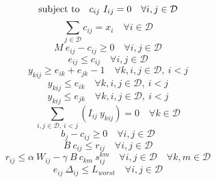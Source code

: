 \documentclass[preprint]{elsarticle}
\begin{document}
\begin{equation}
\textup{subject  to} \ \ \ c_{ij} \ I_{ij} = 0 \quad \forall i,j \in \mathcal{D}
\label{zeroRPOlp:backupDifferentSRG}
\end{equation}
\begin{equation}
\sum_{j \in \mathcal{D}} c_{ij} = x_i \quad \forall i \in \mathcal{D}
\label{zeroRPOlp:totalBackupsSite}
\end{equation}
\begin{equation}
M \ e_{ij} - c_{ij} \geq 0 \quad \forall i,j \in \mathcal{D}
\label{zeroRPOlp:evaluateEijA}
\end{equation}
\begin{equation}
e_{ij} \leq c_{ij} \quad \forall i,j \in \mathcal{D}
\label{zeroRPOlp:evaluateEijB}
\end{equation}
\begin{equation}
y_{kij} \geq e_{ik} + e_{jk} - 1 \quad \forall k,i,j \in \mathcal{D}, \ i < j
\label{zeroRPOlp:evaluateEijC}
\end{equation}
\begin{equation}
y_{kij} \leq e_{ik} \quad \forall k,i,j \in \mathcal{D}, \ i < j
\label{zeroRPOlp:evaluateEijD}
\end{equation}
\begin{equation}
y_{kij} \leq e_{jk} \quad \forall k,i,j \in \mathcal{D}, \ i < j
\label{zeroRPOlp:evaluateEijE}
\end{equation}
\begin{equation}
\sum_{i,j \in \mathcal{D}, \ i < j} (I_{ij} \ y_{kij}) = 0 \quad \forall k \in \mathcal{D}
\label{zeroRPOlp:savePhysicalServers}
\end{equation}
\begin{equation}
b_j - c_{ij} \geq 0 \quad \forall i,j \in \mathcal{D}
\label{zeroRPOlp:maxDedicatedServers}
\end{equation}
\begin{equation}
B \ c_{ij} \leq r_{ij} \quad \forall i,j \in \mathcal{D}
\label{zeroRPOlp:bandwidthDemand}
\end{equation}
\begin{equation}
r_{ij} \leq \alpha \ W_{ij} - \gamma \ B \ c_{km} \ s^{km}_{ij} \quad \forall i,j \in \mathcal{D} \quad \forall k,m \in \mathcal{D}
\label{zeroRPOlp:backupPath}
\end{equation}
\begin{equation}
e_{ij} \ \Delta_{ij} \leq L_{worst} \quad \forall i,j \in \mathcal{D}
\label{zeroRPOlp:latencyDemand}
\end{equation}
\end{document}
